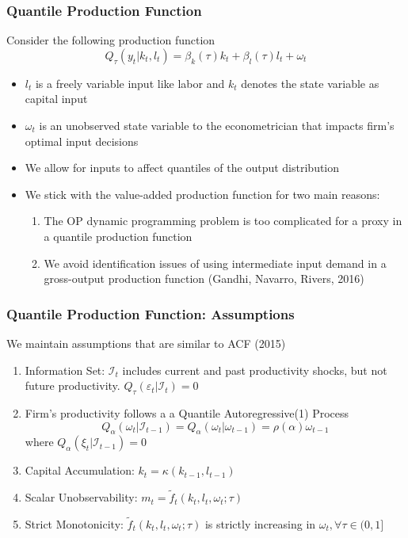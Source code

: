 \documentclass{beamer}
\begin{document}
\begin{frame}
\frametitle{Quantile Production Function}
Consider the following production function
\begin{equation}
	Q_{\tau}(y_{t}|k_{t}, l_{t})=\beta_{k}(\tau)k_{t}+\beta_{l}(\tau)l_{t}+\omega_{t}
\end{equation}
\begin{itemize}
	\item $l_{t}$ is a freely variable input like labor and $k_{t}$ denotes the state variable as capital input
	\item $\omega_{t}$ is an unobserved state variable to the econometrician that impacts firm's optimal input decisions
	\item We allow for inputs to affect quantiles of the output distribution
	\item We stick with the value-added production function for two main reasons:
	\begin{enumerate}
		\item The OP dynamic programming problem is too complicated for a proxy in a quantile production function
		\item We avoid identification issues of using intermediate input demand in a gross-output production function (Gandhi, Navarro, Rivers, 2016)
	\end{enumerate}
\end{itemize}
\end{frame}

\begin{frame}
\frametitle{Quantile Production Function: Assumptions}
We maintain assumptions that are similar to ACF (2015)
\begin{enumerate}
	\item Information Set: $\mathcal{I}_{t}$ includes current and past productivity shocks, but not future productivity. $Q_{\tau}(\varepsilon_{t}|\mathcal{I}_{t})=0$
	\item Firm's productivity follows a a Quantile Autoregressive(1) Process
	\begin{equation}
		Q_{\alpha}(\omega_{t}|\mathcal{I}_{t-1})=Q_{\alpha}(\omega_{t}|\omega_{t-1})=\rho(\alpha)\omega_{t-1}
	\end{equation}
	where $Q_{\alpha}(\xi_{t}|\mathcal{I}_{t-1})=0$
	\item Capital Accumulation: $k_{t}=\kappa(k_{t-1}, l_{t-1})$
	\item Scalar Unobservability: $m_{t}=\tilde{f}_{t}(k_{t}, l_{t}, \omega_{t};\tau)$
	\item Strict Monotonicity: $\tilde{f}_{t}(k_{t}, l_{t}, \omega_{t}; \tau)$ is strictly increasing in $\omega_{t}, \forall \tau \in (0,1]$
\end{enumerate}
\end{frame}
\end{document}
